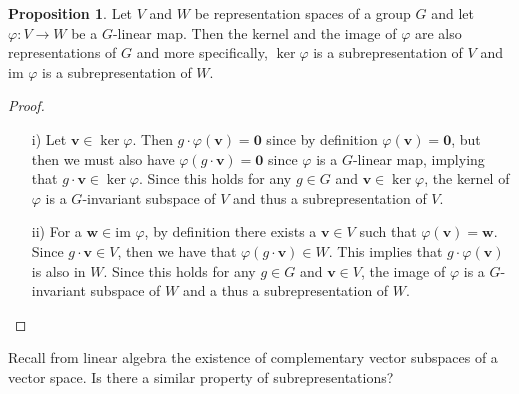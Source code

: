 \documentclass[12pt, a4paper, twoside]{article}
\theoremstyle{definition}
\newtheorem{proposition}[definition]{Proposition}
\theoremstyle{remark}
\numberwithin{equation}{section}
\newcommand{\1}{\mathbf{1}}
\newcommand{\0}{\mathbf{0}}
\newcommand{\im}{\text{im }}
\newcommand{\vvec}{\mathbf{v}}
\newcommand{\wvec}{\mathbf{w}}
\begin{document}
	\begin{proposition}
		Let $V$ and $W$ be representation spaces of a group $G$ and let $\varphi: V \rightarrow W$ be a $G$-linear map. Then the kernel and the image of $\varphi$ are also representations of $G$ and more specifically, $\ker \varphi$ is a subrepresentation of $V$ and $\im \varphi$ is a subrepresentation of $W$. 
	\end{proposition}
	\begin{proof}
		\begin{itemize}
			\item[i)] Let $\vvec \in \ker \varphi$. Then $g \cdot \varphi (\vvec) = \0$ since by definition $\varphi(\vvec) = \0$, but then we must also have $\varphi ( g \cdot \vvec ) = \0$ since $\varphi$ is a $G$-linear map, implying that $g \cdot \vvec \in \ker \varphi$. Since this holds for any $g \in G$ and $\vvec \in \ker \varphi$, the kernel of $\varphi$ is a $G$-invariant subspace of $V$ and thus a subrepresentation of $V$. 
			\item[ii)] For a $\wvec \in \im \varphi$, by definition there exists a $\vvec \in V$ such that $\varphi(\vvec) = \wvec$. Since $g \cdot \vvec \in V$, then we have that $\varphi ( g \cdot \vvec) \in W$. This implies that $g \cdot \varphi (\vvec)$ is also in $W$. Since this holds for any $g \in G$ and $\vvec \in V$, the image of $\varphi$ is a $G$-invariant subspace of $W$ and a thus a subrepresentation of $W$.	\qedhere
		\end{itemize}
	\end{proof}
	
	
	
	
	Recall from linear algebra the existence of complementary vector subspaces of a vector space. Is there a similar property of subrepresentations?
	
\end{document}
